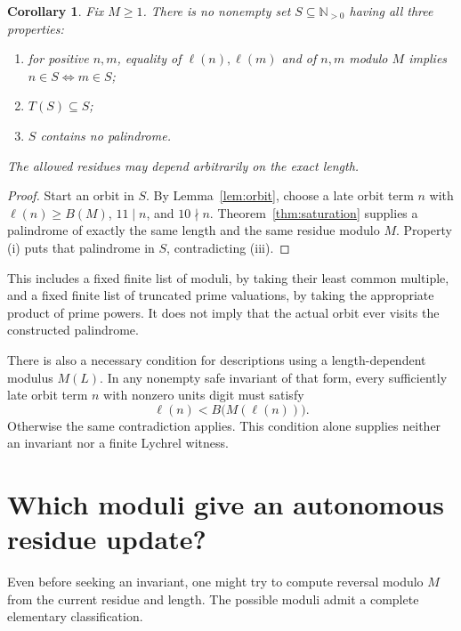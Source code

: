 \documentclass[11pt]{article}
\newtheorem{corollary}[theorem]{Corollary}
\newcommand{\len}{\ell}
\begin{document}
\begin{corollary}\label{cor:invariant}
Fix $M\geq1$. There is no nonempty set $S\subseteq\mathbb N_{>0}$
having all three properties:
\begin{enumerate}[label=(\roman*)]
\item for positive $n,m$, equality of $\len(n),\len(m)$ and of $n,m$
      modulo $M$ implies $n\in S\Longleftrightarrow m\in S$;
\item $T(S)\subseteq S$;
\item $S$ contains no palindrome.
\end{enumerate}
The allowed residues may depend arbitrarily on the exact length.
\end{corollary}
\begin{proof}
Start an orbit in $S$. By Lemma~\ref{lem:orbit}, choose a late orbit
term $n$ with $\len(n)\geq B(M)$, $11\mid n$, and $10\nmid n$.
Theorem~\ref{thm:saturation} supplies a palindrome of exactly the same
length and the same residue modulo $M$. Property (i) puts that palindrome
in $S$, contradicting (iii).
\end{proof}

This includes a fixed finite list of moduli, by taking their least common
multiple, and a fixed finite list of truncated prime valuations, by taking
the appropriate product of prime powers. It does not imply that the
actual orbit ever visits the constructed palindrome.

There is also a necessary condition for descriptions using a
length-dependent modulus $M(L)$. In any nonempty safe invariant of that
form, every sufficiently late orbit term $n$ with nonzero units digit must
satisfy
\[
 \len(n)<B\bigl(M(\len(n))\bigr).
\]
Otherwise the same contradiction applies. This condition alone supplies
neither an invariant nor a finite Lychrel witness.

\section{Which moduli give an autonomous residue update?}
Even before seeking an invariant, one might try to compute reversal
modulo $M$ from the current residue and length. The possible moduli
admit a complete elementary classification.
\end{document}
